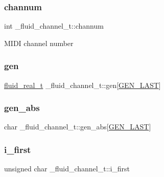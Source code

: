 \subsubsection{\texorpdfstring{channum}{channum}}
{\footnotesize\ttfamily int \+\_\+fluid\+\_\+channel\+\_\+t\+::channum}

M\+I\+DI channel number \mbox{\label{struct__fluid__channel__t_a8371721c75d8302750bf8c0c45fc2c76}} 
\subsubsection{\texorpdfstring{gen}{gen}}
{\footnotesize\ttfamily \hyperlink{fluidsynth__priv_8h_a9e96f0917747b69cabb7c671bc693dbb}{fluid\+\_\+real\+\_\+t} \+\_\+fluid\+\_\+channel\+\_\+t\+::gen\mbox{[}\hyperlink{gen_8h_ad17a24ae3b25f3b8cc5762f818eef9b4a9c372c341b7b1a718f0016f40c615cf3}{G\+E\+N\+\_\+\+L\+A\+ST}\mbox{]}}

\mbox{\label{struct__fluid__channel__t_a431e65009fa1c73f277b141690f0a812}} 
\subsubsection{\texorpdfstring{gen\+\_\+abs}{gen\_abs}}
{\footnotesize\ttfamily char \+\_\+fluid\+\_\+channel\+\_\+t\+::gen\+\_\+abs\mbox{[}\hyperlink{gen_8h_ad17a24ae3b25f3b8cc5762f818eef9b4a9c372c341b7b1a718f0016f40c615cf3}{G\+E\+N\+\_\+\+L\+A\+ST}\mbox{]}}

\mbox{\label{struct__fluid__channel__t_a15ff2c0965bff5c544a38ec71349d5b5}} 
\subsubsection{\texorpdfstring{i\+\_\+first}{i\_first}}
{\footnotesize\ttfamily unsigned char \+\_\+fluid\+\_\+channel\+\_\+t\+::i\+\_\+first}

